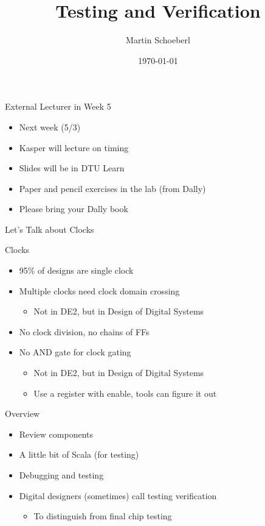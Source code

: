 

\newif\ifbook


\title{Testing and Verification}
\author{Martin Schoeberl}
\date{\today}



\begin{frame}
\titlepage
\end{frame}

\begin{frame}[fragile]{External Lecturer in Week 5}
\begin{itemize}
\item Next week (5/3)
\item Kasper will lecture on timing
\item Slides will be in DTU Learn
\item Paper and pencil exercises in the lab (from Dally)
\item Please bring your Dally book
\end{itemize}
\end{frame}

\begin{frame}[fragile]{Let's Talk about Clocks}
\end{frame}

\begin{frame}[fragile]{Clocks}
\begin{itemize}
\item 95\% of designs are single clock
\item Multiple clocks need clock domain crossing
\begin{itemize}
\item Not in DE2, but in Design of Digital Systems
\end{itemize}
\item No clock division, no chains of FFs
\item No AND gate for clock gating
\begin{itemize}
\item Not in DE2, but in Design of Digital Systems
\item Use a register with enable, tools can figure it out
\end{itemize}
\end{itemize}
\end{frame}

\begin{frame}[fragile]{Overview}
\begin{itemize}
\item Review components
\item A little bit of Scala (for testing)
\item Debugging and testing
\item Digital designers (sometimes) call testing verification
\begin{itemize}
\item To distinguish from final chip testing
\end{itemize}
\end{itemize}
\end{frame}

